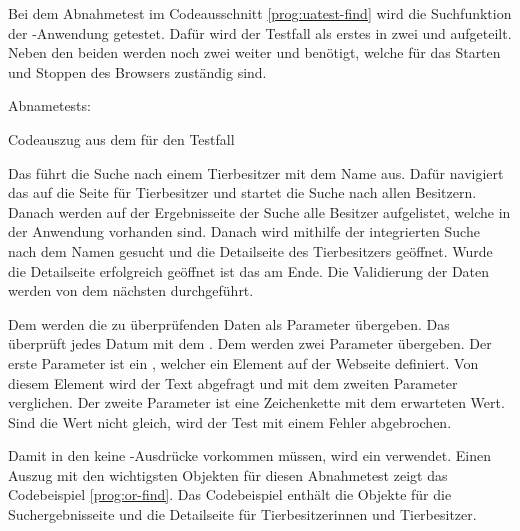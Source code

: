 Bei dem  Abnahmetest im Codeausschnitt \ref{prog:uatest-find} wird die Suchfunktion der -Anwendung getestet. Dafür wird der Testfall als erstes in zwei   und  aufgeteilt. Neben den beiden  werden noch zwei weiter   und   benötigt, welche für das Starten und Stoppen des Browsers zuständig sind. 

\begin{program}

\caption{Abnametests: }
\label{prog:uatest-find}
\end{program}


\begin{program}

\caption{Codeauszug aus dem  für den Testfall }
\label{prog:or-find}
\end{program}

\SuperPar
Das   führt die Suche nach einem Tierbesitzer mit dem Name  aus. Dafür navigiert das  auf die Seite für Tierbesitzer und startet die Suche nach allen Besitzern. Danach werden auf der Ergebnisseite der Suche alle Besitzer aufgelistet, welche in der Anwendung vorhanden sind. Danach wird mithilfe der integrierten Suche nach dem Namen  gesucht und die Detailseite des Tierbesitzers geöffnet. Wurde die Detailseite erfolgreich geöffnet ist das  am Ende. Die Validierung der Daten werden von dem nächsten   durchgeführt.

\SuperPar
Dem   werden die zu überprüfenden Daten als Parameter übergeben. Das  überprüft jedes Datum mit dem  . Dem  werden zwei Parameter übergeben. Der erste Parameter ist ein , welcher ein Element auf der Webseite definiert. Von diesem Element wird der Text abgefragt und mit dem zweiten Parameter verglichen. Der zweite Parameter ist eine Zeichenkette mit dem erwarteten Wert. Sind die Wert nicht gleich, wird der Test mit einem Fehler abgebrochen. 

\SuperPar
Damit in den  keine -Ausdrücke vorkommen müssen, wird ein  verwendet. Einen Auszug mit den wichtigsten Objekten für diesen Abnahmetest zeigt das Codebeispiel \ref{prog:or-find}. Das Codebeispiel enthält die Objekte für die Suchergebnisseite und die Detailseite für Tierbesitzerinnen und Tierbesitzer.

